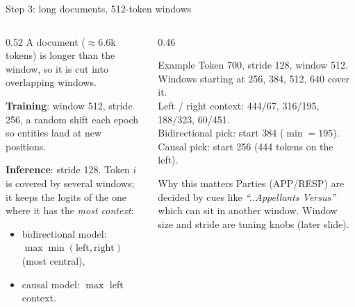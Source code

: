 \documentclass[aspectratio=169,11pt]{beamer}
\begin{document}
\begin{frame}{Step 3: long documents, 512-token windows}
  \begin{columns}[T]
    \begin{column}{0.52\textwidth}
      \footnotesize
      A document ($\approx$6.6k tokens) is longer than the window, so it is cut into overlapping windows.
      \begin{center}
      \end{center}
      \textbf{Training}: window 512, stride 256, a random shift each epoch so entities land at new positions.

      \textbf{Inference}: stride 128. Token $i$ is covered by several windows; it keeps the
      logits of the one where it has the \emph{most context}:
      \begin{itemize}
        \item bidirectional model: $\max \min(\text{left}, \text{right})$ (most central),
        \item causal model: $\max$ left context.
      \end{itemize}
    \end{column}
    \begin{column}{0.46\textwidth}
      \footnotesize
      \begin{exampleblock}{Example}
        Token 700, stride 128, window 512.\\
        Windows starting at 256, 384, 512, 640 cover it.\\
        Left / right context: 444/67, 316/195, 188/323, 60/451.\\
        Bidirectional pick: start 384 ($\min = 195$).\\
        Causal pick: start 256 (444 tokens on the left).
      \end{exampleblock}
      \begin{block}{Why this matters}
        Parties (APP/RESP) are decided by cues like \emph{``..Appellants Versus''} which can
        sit in another window. Window size and stride are tuning knobs (later slide).
      \end{block}
    \end{column}
  \end{columns}
\end{frame}
\end{document}
